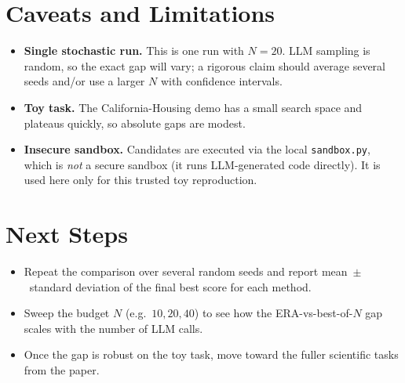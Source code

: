 \documentclass[11pt]{article}
\begin{document}
\section{Caveats and Limitations}
\begin{itemize}
  \item \textbf{Single stochastic run.} This is one run with $N=20$. LLM sampling
        is random, so the exact gap will vary; a rigorous claim should average
        several seeds and/or use a larger $N$ with confidence intervals.
  \item \textbf{Toy task.} The California-Housing demo has a small search space
        and plateaus quickly, so absolute gaps are modest.
  \item \textbf{Insecure sandbox.} Candidates are executed via the local
        \texttt{sandbox.py}, which is \emph{not} a secure sandbox (it runs
        LLM-generated code directly). It is used here only for this trusted toy
        reproduction.
\end{itemize}

\section{Next Steps}
\begin{itemize}
  \item Repeat the comparison over several random seeds and report
        mean~$\pm$~standard deviation of the final best score for each method.
  \item Sweep the budget $N$ (e.g.\ $10, 20, 40$) to see how the ERA-vs-best-of-$N$
        gap scales with the number of LLM calls.
  \item Once the gap is robust on the toy task, move toward the fuller scientific
        tasks from the paper.
\end{itemize}
\end{document}
